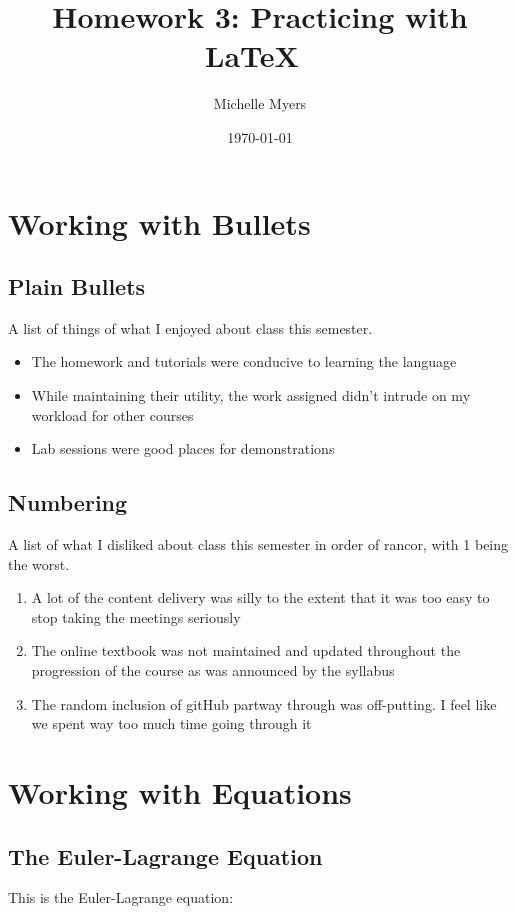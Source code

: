 \documentclass[12pt]{article}
\title{Homework 3: Practicing with \LaTeX\ }
\author{Michelle Myers}
\date{\today}
\begin{document}
\maketitle

\section{Working with Bullets}

\subsection{Plain Bullets}
A list of things of what I enjoyed about class this semester.
\begin{itemize}
  \item The homework and tutorials were conducive to learning the
    language
  \item While maintaining their utility, the work assigned didn't
    intrude on my workload for other courses
  \item Lab sessions were good places for demonstrations 
\end{itemize}

\subsection{Numbering}
A list of what I disliked about class this semester in order of
rancor, with 1 being the worst.
\begin{enumerate}
  \item A lot of the content delivery was silly to the extent that it
    was too easy to stop taking the meetings seriously
  \item The online textbook was not maintained and updated throughout
    the progression of the course as was announced by the syllabus
  \item The random inclusion of gitHub partway through was
    off-putting. I feel like we spent way too much time going through it
\end{enumerate}

\section{Working with Equations}

\subsection{The Euler-Lagrange Equation}
This is the Euler-Lagrange equation:
\end{document}
